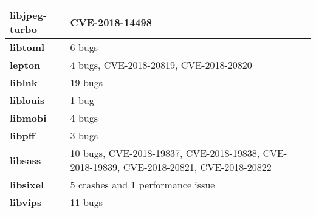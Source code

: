 \begin{longtable}{| p{} | p{} |}
    \\ \hline
\textbf{libjpeg-turbo}  & CVE-2018-14498                                                                                                                                                                                     \\ \hline
\textbf{libtoml}        & 6 bugs                                                                                                                                                                                             \\ \hline
\textbf{lepton}         & 4 bugs, CVE-2018-20819, CVE-2018-20820                                                                                                                                                                                         \\ \hline
\textbf{liblnk}         & 19 bugs                                                                                                                                                                                            \\ \hline
\textbf{liblouis}       & 1 bug                                                                                                                                                                                              \\ \hline
\textbf{libmobi}        & 4 bugs                                                                                                                                                                                             \\ \hline
\textbf{libpff}         & 3 bugs                                                                                                                                                                                             \\ \hline
\textbf{libsass}        & 10 bugs, CVE-2018-19837, CVE-2018-19838, CVE-2018-19839,  CVE-2018-20821, CVE-2018-20822                                                                                                                \\ \hline
\textbf{libsixel}       & 5 crashes and 1 performance issue                                                                                                                                                                  \\ \hline
\textbf{libvips}        & 11 bugs                                                                                                                                                                                            \\ \hline

\end{longtable}
